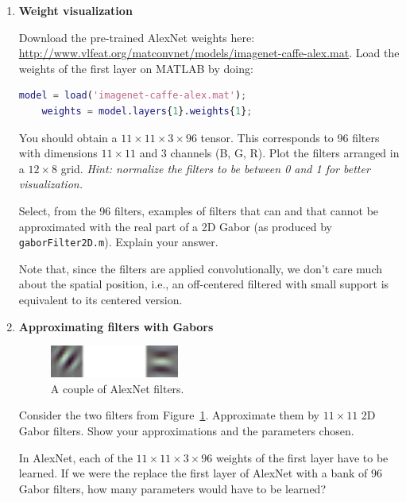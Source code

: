 \begin{enumerate}
\item {} \textbf{Weight visualization}

  Download the pre-trained AlexNet weights here:  \url{http://www.vlfeat.org/matconvnet/models/imagenet-caffe-alex.mat}.
  Load the weights of the first layer on MATLAB by doing:
  \begin{lstlisting}[language=matlab]
    model = load('imagenet-caffe-alex.mat');
    weights = model.layers{1}.weights{1};
  \end{lstlisting}
  You should obtain a $11\times 11\times 3\times 96$ tensor.
  This corresponds to 96 filters with dimensions $11\times 11$ and 3 channels (B, G, R).
  Plot the filters arranged in a $12\times 8$ grid. \emph{Hint: normalize the filters to be between 0 and 1 for better visualization.}

  Select, from the 96 filters, examples of filters that can and that cannot be approximated with the real part of a 2D Gabor (as produced by \verb|gaborFilter2D.m|).
  Explain your answer.

  Note that, since the filters are applied convolutionally, we don't care much about the spatial position, i.e., an off-centered filtered with small support is equivalent to its centered version.

\item {} \textbf{Approximating filters with Gabors}
    \begin{figure}[ht!]
      \begin{center}
        \includegraphics[width=0.4\textwidth]{images/alexnet.png}
      \end{center}
      \caption{\label{fig:alexnet} A couple of AlexNet filters.}
    \end{figure}

  Consider the two filters from Figure~\ref{fig:alexnet}.
  Approximate them by $11\times 11$ 2D Gabor filters.
  Show your approximations and the parameters chosen.

  In AlexNet, each of the $11\times 11\times 3\times 96$ weights of the first layer have to be learned.
  If we were the replace the first layer of AlexNet with a bank of $96$ Gabor filters, how many parameters would have to be learned?
\end{enumerate}



